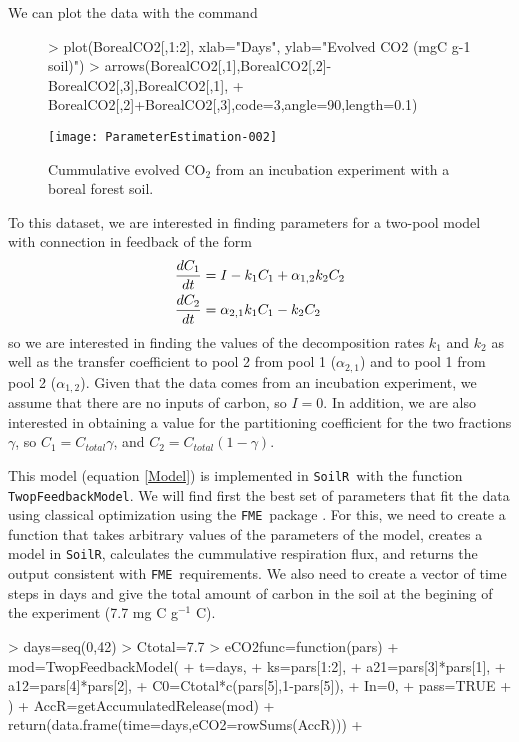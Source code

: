 \documentclass[a4paper]{article}
\newcommand{\SoilR}{\texttt{SoilR}}
\newcommand{\FME}{\texttt{FME}}
\begin{document}
We can plot the data with the command

\begin{figure}
  \centering
\begin{Schunk}
\begin{Sinput}
> plot(BorealCO2[,1:2], xlab="Days", ylab="Evolved CO2 (mgC g-1 soil)")
> arrows(BorealCO2[,1],BorealCO2[,2]-BorealCO2[,3],BorealCO2[,1],
+        BorealCO2[,2]+BorealCO2[,3],code=3,angle=90,length=0.1)
\end{Sinput}
\end{Schunk}
\texttt{[image: ParameterEstimation-002]}
  \caption{Cummulative evolved CO$_2$ from an incubation experiment with a boreal forest soil.}
  \label{fig:eCO2}
\end{figure}

To this dataset, we are interested in finding parameters for a two-pool model with connection in feedback of the form \citep{SierraGMD}
\begin{align} \label{Model}
\frac{dC_1}{dt} &= I - k_1 C_1 + \alpha_{1,2} k_2 C_2 \notag \\
\frac{dC_2}{dt} &= \alpha_{2,1} k_1 C_1 - k_2 C_2
\end{align}
so we are interested in finding the values of the decomposition rates $k_1$ and $k_2$ as well as the transfer coefficient to pool 2 from pool 1 ($\alpha_{2,1}$) and to pool 1 from pool 2 ($\alpha_{1,2}$). Given that the data comes from an incubation experiment, we assume that there are no inputs of carbon, so $I=0$. In addition, we are also interested in obtaining a value for the partitioning coefficient for the two fractions $\gamma$, so $C_1 = C_{total} \gamma$, and $C_2 = C_{total} (1- \gamma)$. 

This model (equation \ref{Model}) is implemented in \SoilR \, with the function {\tt TwopFeedbackModel}. We will find first the best set of parameters that fit the data using classical optimization using the \FME \, package \citep{Soetaert}. For this, we need to create a function that takes arbitrary values of the parameters of the model, creates a model in \SoilR, calculates the cummulative respiration flux, and returns the output consistent with \FME \, requirements. We also need to create a vector of time steps in days and give the total amount of carbon in the soil at the begining of the experiment (7.7 mg C g$^{-1}$ C). 

\begin{Schunk}
\begin{Sinput}
> days=seq(0,42)
> Ctotal=7.7
> eCO2func=function(pars){
+   mod=TwopFeedbackModel(
+   t=days,
+   ks=pars[1:2],
+   a21=pars[3]*pars[1],
+   a12=pars[4]*pars[2], 
+   C0=Ctotal*c(pars[5],1-pars[5]), 
+   In=0,
+   pass=TRUE
+   )
+   AccR=getAccumulatedRelease(mod)
+   return(data.frame(time=days,eCO2=rowSums(AccR)))
+ }
\end{Sinput}
\end{Schunk}
\end{document}
